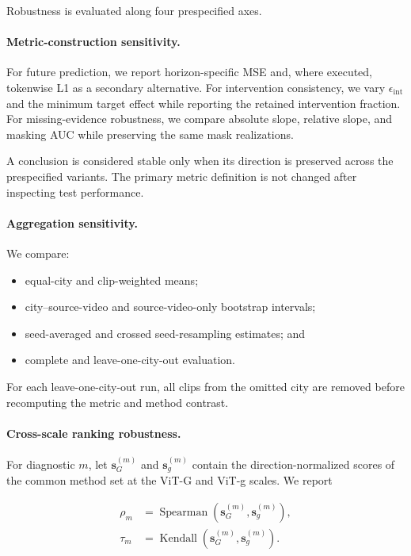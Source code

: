 Robustness is evaluated along four prespecified axes.

\paragraph{Metric-construction sensitivity.}
For future prediction, we report horizon-specific MSE and, where
executed, tokenwise L1 as a secondary alternative. For intervention
consistency, we vary \(\epsilon_{\mathrm{int}}\) and the minimum target
effect while reporting the retained intervention fraction. For
missing-evidence robustness, we compare absolute slope, relative slope,
and masking AUC while preserving the same mask realizations.

A conclusion is considered stable only when its direction is preserved
across the prespecified variants. The primary metric definition is not
changed after inspecting test performance.

\paragraph{Aggregation sensitivity.}
We compare:

\begin{itemize}
    \item equal-city and clip-weighted means;
    \item city--source-video and source-video-only bootstrap intervals;
    \item seed-averaged and crossed seed-resampling estimates; and
    \item complete and leave-one-city-out evaluation.
\end{itemize}

For each leave-one-city-out run, all clips from the omitted city are
removed before recomputing the metric and method contrast.

\paragraph{Cross-scale ranking robustness.}
For diagnostic \(m\), let
\(\mathbf s_G^{(m)}\) and \(\mathbf s_g^{(m)}\) contain the
direction-normalized scores of the common method set at the ViT-G and
ViT-g scales. We report

\begin{equation*}
\begin{aligned}
\rho_m
&=
\operatorname{Spearman}
\left(
\mathbf s_G^{(m)},
\mathbf s_g^{(m)}
\right),
\\
\tau_m
&=
\operatorname{Kendall}
\left(
\mathbf s_G^{(m)},
\mathbf s_g^{(m)}
\right).
\end{aligned}
\end{equation*}

